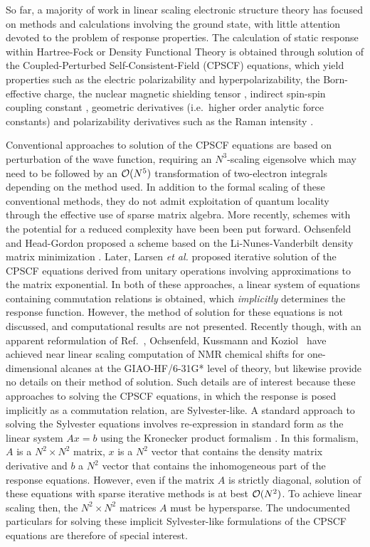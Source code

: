 \documentclass[prl,aps,letterpaper,twocolumn,showpacs,twocolumngrid,superbib]{revtex4}
\begin{document}
So far, a majority of work in linear scaling electronic structure theory 
has focused on methods and calculations involving the ground state, with little 
attention devoted to the problem of response properties.  The calculation of static
response within  Hartree-Fock or Density Functional Theory is obtained through solution 
of the Coupled-Perturbed Self-Consistent-Field (CPSCF) equations, which yield properties 
such as the electric polarizability and hyperpolarizability, the Born-effective charge, 
the nuclear magnetic shielding tensor \cite{KWolinski90}, indirect spin-spin coupling
constant \cite{CPennington91,OMalkin96}, geometric derivatives (i.e.~higher order
analytic force constants) \cite{RAmos89} and polarizability derivatives such as the Raman 
intensity \cite{MLazzeri03,OQuinet01}.

Conventional approaches to solution of the CPSCF equations 
\cite{JPople79,HSekino86,SKarna91} are based on perturbation of the wave 
function, requiring an $N^3$-scaling eigensolve which may need to be followed by an ${\cal O}(N^5)$ 
transformation of two-electron integrals depending on the method used. 
In addition to the formal scaling of these conventional methods, they do not admit exploitation 
of quantum locality through the effective use of sparse matrix algebra.  
More recently, schemes with the potential for a reduced complexity have been been put forward.
Ochsenfeld and Head-Gordon proposed a scheme based on the Li-Nunes-Vanderbilt 
density matrix minimization \cite{Ochsenfeld97}.  Later, Larsen {\em et al.} \cite{HLarsen01a} 
proposed iterative solution of the CPSCF equations derived from unitary operations
involving approximations to the matrix exponential.    In both of these approaches, 
a linear system of equations containing commutation relations is obtained, which {\em implicitly}
determines the response function.  However, the method of solution for these equations
is not discussed, and computational results are not presented.  Recently though, 
with an apparent reformulation of Ref.~,
Ochsenfeld, Kussmann and Koziol~\cite{COchsenfeld04} have achieved near linear scaling computation
of NMR chemical shifts for one-dimensional alcanes at the GIAO-HF/6-31G* level of theory,
but likewise provide no details on their method of solution.  Such details are of interest
because these approaches to solving the CPSCF equations, in which the response is posed implicitly
as a commutation relation, are Sylvester-like.  A standard approach to solving the Sylvester equations 
involves re-expression in standard form as the linear system $Ax=b$ using the Kronecker product 
formalism \cite{JBrandts01}.  In this formalism, $A$ is a $N^2\times N^2$ matrix, $x$ is a $N^2$ vector that 
contains the density matrix derivative and $b$ a $N^2$ vector that contains the inhomogeneous
part of the response equations.  However, even if the matrix $A$ is strictly diagonal,
solution of these equations with sparse iterative methods is at best ${\cal O}(N^2)$.  
To achieve linear scaling then, the  $N^2\times N^2$ matrices $A$ must be hypersparse.
The undocumented particulars for solving these implicit Sylvester-like formulations of the 
CPSCF equations are therefore of special interest. 
\end{document}
